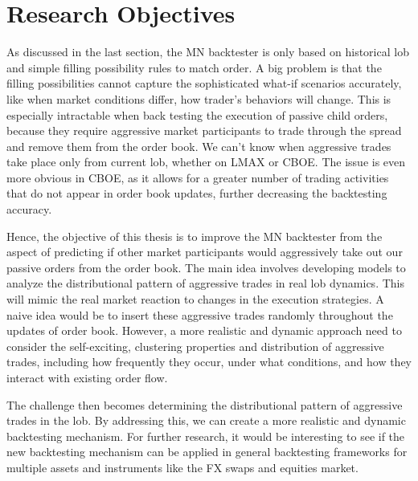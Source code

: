 \section{Research Objectives}
As discussed in the last section, the MN backtester is only based on historical \gls{lob} and simple filling possibility rules to match order. A big problem is that the filling possibilities cannot capture the sophisticated what-if scenarios accurately, like when market conditions differ, how trader's behaviors will change. This is especially intractable when back testing the execution of passive child orders, because they require aggressive market participants to trade through the spread and remove them from the order book. We can't know when aggressive trades take place only from current \gls{lob}, whether on LMAX or CBOE. The issue is even more obvious in CBOE, as it allows for a greater number of trading activities that do not appear in order book updates, further decreasing the backtesting accuracy. 

Hence, the objective of this thesis is to improve the MN backtester from the aspect of predicting if other market participants would aggressively take out our passive orders from the order book. The main idea involves developing models to analyze the distributional pattern of aggressive trades in real \gls{lob} dynamics. This will mimic the real market reaction to changes in the execution strategies. A naive idea would be to insert these aggressive trades randomly throughout the updates of order book. However, a more realistic and dynamic approach need to consider the self-exciting, clustering properties and distribution of aggressive trades, including how frequently they occur, under what conditions, and how they interact with existing order flow.

The challenge then becomes determining the distributional pattern of aggressive trades in the \gls{lob}. By addressing this, we can create a more realistic and dynamic backtesting mechanism. For further research, it would be interesting to see if the new backtesting mechanism can be applied in general backtesting frameworks for multiple assets and instruments like the FX swaps and equities market.



